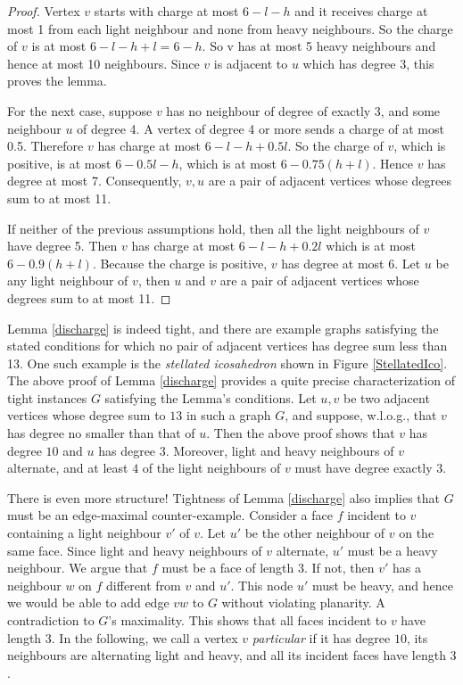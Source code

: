 \documentclass{article}
\newcommand{\0}{\mathbb{0}}
\newcommand{\1}{\mathbb{1}}
\begin{document}
\begin{proof}
 Vertex $v$ starts with charge at most $6-l-h$ and it receives charge at most 1 from each light neighbour and none from heavy neighbours. So the charge of $v$ is at most  $6-l-h +l =6 -h $.  So v has at most 5 heavy neighbours and hence at most 10 neighbours. Since $v$ is adjacent to $u$ which has degree 3, this proves the lemma. 
 
 For the next case, suppose $v$ has no neighbour of degree of exactly 3, and some neighbour $u$ of degree 4.  A vertex of degree 4 or more sends a charge of at most 0.5. Therefore $v$ has charge at most $ 6-l-h +0.5l $.   So the charge of $v$, which is positive, is at most $ 6-0.5l-h $, which is at most  $6- 0.75(h+l) $. Hence $v$ has degree at most 7. Consequently, $v,u$ are a pair of adjacent vertices whose degrees sum to at most 11. 
 
 If neither of the previous assumptions hold, then all the light neighbours of $v$ have degree 5. Then $v$ has charge at most $ 6-l-h +0.2l $ which is at most $6-0.9(h+l) $. Because the charge is positive, $v$ has degree at most 6. Let $u$ be any light neighbour of $v$, then $u$ and $v$ are a pair of adjacent vertices whose degrees sum to at most 11.
 \end{proof}


Lemma \ref{discharge} is indeed tight, and there are example graphs satisfying the stated conditions for which
no pair of adjacent vertices has degree sum less than 13. One such example is the {\em stellated icosahedron}
shown in Figure \ref{StellatedIco}. The above proof of Lemma \ref{discharge} provides a quite precise
characterization of tight instances $G$ satisfying the Lemma's conditions. Let $u, v$ be two adjacent vertices
whose degree sum to $13$ in such a graph $G$, and suppose, w.l.o.g., that $v$ has degree no smaller than that
of $u$. Then the above proof shows that $v$ has degree $10$ and $u$ has degree $3$. Moreover, light and heavy
neighbours of $v$ alternate, and at least $4$ of the light neighbours of $v$ must have degree exactly $3$. 

There is even more structure! Tightness of Lemma \ref{discharge} also implies that $G$ must be an edge-maximal
counter-example. Consider a face $f$ incident to $v$ containing a light neighbour $v'$ of $v$. 
Let $u'$ be the other neighbour of $v$ on the same face. Since light and heavy neighbours of $v$
alternate, $u'$ must be a heavy neighbour. We argue that $f$ must be a face of length $3$. If not, then $v'$
has a neighbour $w$ on $f$ different from $v$ and $u'$. This node $u'$ must be heavy, and hence we would be
able to add edge $vw$ to $G$ without violating planarity. A contradiction to $G$'s maximality. This shows that
all faces incident to $v$ have length $3$. 
In the following, we call a vertex $v$ {\em particular} if it has degree $10$, its neighbours are alternating
light and heavy, and all its incident faces have length $3$. 
  
\end{document}

